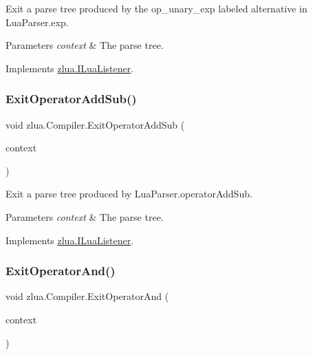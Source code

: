 Exit a parse tree produced by the {\ttfamily op\+\_\+unary\+\_\+exp} labeled alternative in Lua\+Parser.\+exp. 


\begin{DoxyParams}{Parameters}
{\em context} & The parse tree.\\
\hline
\end{DoxyParams}


Implements \mbox{\hyperlink{interfacezlua_1_1_i_lua_listener_a16b9b227b375c5bbe949db6e101f2dce}{zlua.\+I\+Lua\+Listener}}.

\mbox{\label{classzlua_1_1_compiler_a1559fa97735e564dc0cc25c6c5ec355a}} 
\subsubsection{\texorpdfstring{Exit\+Operator\+Add\+Sub()}{ExitOperatorAddSub()}}
{\footnotesize\ttfamily void zlua.\+Compiler.\+Exit\+Operator\+Add\+Sub (\begin{DoxyParamCaption}\item[{\mbox{[}\+Not\+Null\mbox{]} \mbox{\hyperlink{classzlua_1_1_lua_parser_1_1_operator_add_sub_context}{Lua\+Parser.\+Operator\+Add\+Sub\+Context}}}]{context }\end{DoxyParamCaption})}



Exit a parse tree produced by Lua\+Parser.\+operator\+Add\+Sub. 


\begin{DoxyParams}{Parameters}
{\em context} & The parse tree.\\
\hline
\end{DoxyParams}


Implements \mbox{\hyperlink{interfacezlua_1_1_i_lua_listener_a3d98f03e4ef336437a07903ea76df622}{zlua.\+I\+Lua\+Listener}}.

\mbox{\label{classzlua_1_1_compiler_a57e026e3b4f6ec40d78cc9f4c8068ad3}} 
\subsubsection{\texorpdfstring{Exit\+Operator\+And()}{ExitOperatorAnd()}}
{\footnotesize\ttfamily void zlua.\+Compiler.\+Exit\+Operator\+And (\begin{DoxyParamCaption}\item[{\mbox{[}\+Not\+Null\mbox{]} \mbox{\hyperlink{classzlua_1_1_lua_parser_1_1_operator_and_context}{Lua\+Parser.\+Operator\+And\+Context}}}]{context }\end{DoxyParamCaption})}



